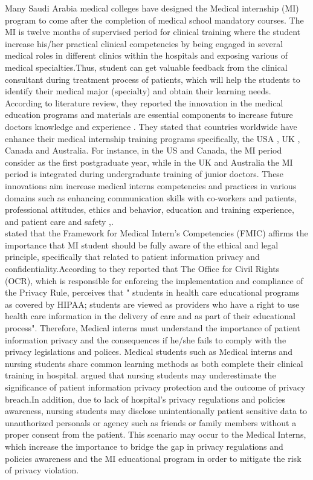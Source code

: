 Many Saudi Arabia medical colleges have designed the Medical internship (MI) program to come after the completion of medical school mandatory courses. The MI is twelve months of supervised period for clinical training where the student increase his/her practical clinical competencies by being engaged in several medical roles in different clinics within the hospitals and exposing various of medical specialties.Thus, student can get valuable feedback from the clinical consultant during treatment process of patients, which will help the students to identify their medical major (specialty) and obtain their learning needs. According to \citet{Al-Moamary2010} literature review, they reported the innovation in the medical education programs and materials are essential components to increase future doctors knowledge and experience . They stated that countries worldwide have enhance their medical internship training programs specifically, the USA , UK , Canada and Australia. For instance, in the US and Canada, the MI period consider as the first postgraduate year, while in the UK and Australia the MI period is integrated during undergraduate training of junior doctors. These innovations aim increase medical interns competencies and practices in various domains such as enhancing communication skills with co-workers and patients, professional attitudes, ethics and behavior, education and training experience, and patient care and safety \cite{Al-Moamary2010},\cite{FaculityofMedicine2009}.
\\
\citet{Al-moamary2012} stated that the Framework for Medical Intern's Competencies (FMIC) affirms the importance that MI student should be fully aware of the ethical and legal principle, specifically that related to patient information privacy and confidentiality.According to \citet{Wimberley2005} they reported that The Office for Civil Rights (OCR), which is responsible for enforcing the implementation and compliance of the Privacy Rule, perceives that " students in health care educational programs as covered by HIPAA; students are viewed as providers who have a right to use health care information in the delivery of care and as part of their educational process"\cite{Wimberley2005}. Therefore, Medical interns must understand the importance of patient information privacy and the consequences if he/she fails to comply with the privacy legislations and polices. Medical students such as Medical interns and nursing students share common learning methods as both complete their clinical training in hospital.\cite{Park2017} argued that nursing students may underestimate the significance of patient information privacy protection and the outcome of privacy breach.In addition, due to lack of hospital's privacy regulations and policies awareness, nursing students may disclose unintentionally patient sensitive data to unauthorized personals or agency such as friends or family members without a proper consent from the patient. This scenario may occur to the Medical Interns, which increase the importance to bridge the gap in privacy regulations and policies awareness and the MI educational program in order to mitigate the risk of privacy violation.   


